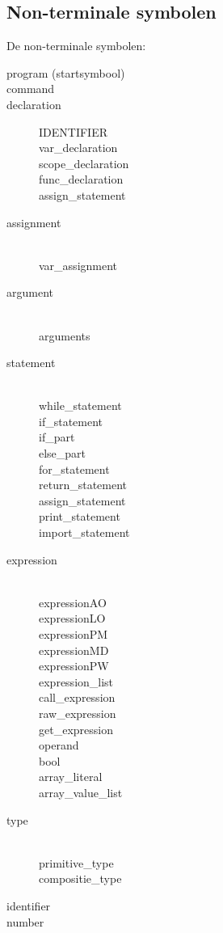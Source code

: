 \subsection{Non-terminale symbolen} %
\label{sub:non_terminale_symbolen}
De non-terminale symbolen:
\begin{description}
    \item[program (startsymbool)] 
    \item[command]
    \item[declaration] IDENTIFIER\hfill \\
        var\_declaration \\
        scope\_declaration \\
        func\_declaration \\
        assign\_statement
    \item[assignment] \hfill \\
        var\_assignment
    \item[argument] \hfill \\
        arguments
    \item[statement] \hfill \\
        while\_statement \\
        if\_statement \\ 
        if\_part \\
        else\_part \\
        for\_statement \\
        return\_statement \\
        assign\_statement \\
        print\_statement \\
        import\_statement
    \item[expression] \hfill \\
        expressionAO \\
        expressionLO \\
        expressionPM \\
        expressionMD \\
        expressionPW \\
        expression\_list \\
        call\_expression \\
        raw\_expression \\
        get\_expression \\
        operand \\
        bool \\
        array\_literal \\
        array\_value\_list
    \item[type] \hfill \\
        primitive\_type \\
        compositie\_type
    \item[identifier]
    \item[number]
\end{description}

